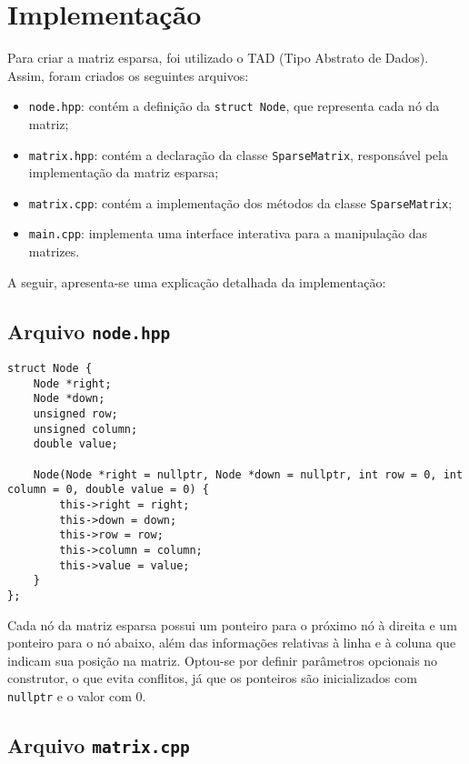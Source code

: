 \documentclass[12pt]{article}
\begin{document}
\section{Implementação}

Para criar a matriz esparsa, foi utilizado o TAD (Tipo Abstrato de Dados). Assim, foram criados os seguintes arquivos:

\begin{itemize}
  \item \verb|node.hpp|: contém a definição da \verb|struct Node|, que representa cada nó da matriz;
  \item \verb|matrix.hpp|: contém a declaração da classe \verb|SparseMatrix|, responsável pela implementação da matriz esparsa;
  \item \verb|matrix.cpp|: contém a implementação dos métodos da classe \verb|SparseMatrix|;
  \item \verb|main.cpp|: implementa uma interface interativa para a manipulação das matrizes.
\end{itemize}

A seguir, apresenta-se uma explicação detalhada da implementação:

\subsection{Arquivo \verb|node.hpp|}

\begin{lstlisting}
struct Node {
    Node *right;
    Node *down;
    unsigned row;
    unsigned column;
    double value;

    Node(Node *right = nullptr, Node *down = nullptr, int row = 0, int column = 0, double value = 0) {
        this->right = right;
        this->down = down;
        this->row = row;
        this->column = column;
        this->value = value;
    }
};
\end{lstlisting}

Cada nó da matriz esparsa possui um ponteiro para o próximo nó à direita e um ponteiro para o nó abaixo, além das informações relativas à linha e à coluna que indicam sua posição na matriz. Optou-se por definir parâmetros opcionais no construtor, o que evita conflitos, já que os ponteiros são inicializados com \verb|nullptr| e o valor com 0.

\subsection{Arquivo \verb|matrix.cpp|}
\end{document}
